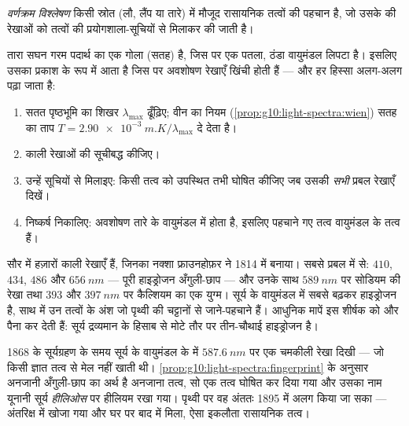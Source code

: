 \begin{definition}[वर्णक्रम विश्लेषण]\label{def:g10:light-spectra:analysis}
\emph{वर्णक्रम विश्लेषण} किसी स्रोत (लौ, लैंप
या तारे) में मौजूद रासायनिक तत्वों की पहचान है, जो उसके
 की रेखाओं को तत्वों की प्रयोगशाला-सूचियों से मिलाकर की
जाती है।
\end{definition}

\begin{method}[तारकीय वर्णक्रम पढ़ना]\label{met:g10:light-spectra:reading}
तारा सघन गरम पदार्थ का एक गोला (सतह) है, जिस पर एक पतला, ठंडा वायुमंडल
लिपटा है। इसलिए उसका प्रकाश  के रूप में आता है
जिस पर अवशोषण रेखाएँ खिंची होती हैं --- और हर हिस्सा अलग-अलग पढ़ा जाता
है:
\begin{enumerate}
  \item सतत पृष्ठभूमि का शिखर $\lambda_{\max}$ ढूँढ़िए; वीन का नियम (\cref{prop:g10:light-spectra:wien})
        सतह का ताप $T = \qty{2.90e-3}{m.K} / \lambda_{\max}$ दे देता है।
  \item काली रेखाओं की  सूचीबद्ध कीजिए।
  \item उन्हें सूचियों से मिलाइए: किसी तत्व को उपस्थित तभी घोषित कीजिए
        जब उसकी \emph{सभी} प्रबल रेखाएँ दिखें।
  \item निष्कर्ष निकालिए: अवशोषण तारे के वायुमंडल में होता है, इसलिए
        पहचाने गए तत्व वायुमंडल के तत्व हैं।
\end{enumerate}
\end{method}

\begin{example}[सूर्य का नुस्ख़ा]\label{ex:g10:light-spectra:sunrecipe}
सौर  में हज़ारों काली रेखाएँ हैं, जिनका नक्शा
फ्राउनहोफ़र ने 1814 में बनाया। सबसे प्रबल में से: $410$, $434$,
$486$ और $\qty{656}{nm}$ --- पूरी हाइड्रोजन अँगुली-छाप --- और उनके साथ
$\qty{589}{nm}$ पर सोडियम की रेखा तथा $393$ और $\qty{397}{nm}$ पर कैल्शियम का एक
युग्म। सूर्य के वायुमंडल में सबसे बढ़कर हाइड्रोजन है, साथ में उन तत्वों
के अंश जो पृथ्वी की चट्टानों से जाने-पहचाने हैं। आधुनिक मापें इस शीर्षक
को और पैना कर देती हैं: सूर्य द्रव्यमान के हिसाब से मोटे तौर पर
तीन-चौथाई हाइड्रोजन है।
\end{example}

\begin{remark}[वह तत्व जो पहले आकाश में मिला]\label{rem:g10:light-spectra:helium}
1868 के सूर्यग्रहण के समय सूर्य के वायुमंडल के  में
$\qty{587.6}{nm}$ पर एक चमकीली रेखा दिखी --- जो किसी ज्ञात तत्व से मेल नहीं खाती
थी। \cref{prop:g10:light-spectra:fingerprint} के अनुसार अनजानी अँगुली-छाप का अर्थ है अनजाना तत्व, सो एक
तत्व घोषित कर दिया गया और उसका नाम यूनानी सूर्य \emph{हीलिओस} पर हीलियम
रखा गया। पृथ्वी पर वह अंततः 1895 में अलग किया जा सका --- अंतरिक्ष में
खोजा गया और घर पर बाद में मिला, ऐसा इकलौता रासायनिक तत्व।
\end{remark}

